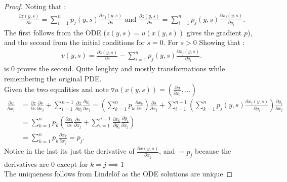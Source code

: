 \begin{proof}
Noting that : 
\begin{align*}
  \frac{\partial z(y,s)}{\partial s} =  \sum_{i=1}^n p_j(y,s)\frac{\partial x_j(y,s)}{\partial s}  \text{  and  } \frac{\partial z(y,s)}{\partial s} =  \sum_{i=1}^n p_j(y,s)\frac{\partial x_j(y,s)}{\partial y_i}
.\end{align*}
The first follows from the ODE ($z(y,s)=u(x(y,s)) $  gives the gradient $p$),
and the second from the initial conditions for $s=0$. For $s>0$
Showing that : 
\begin{align*}
  v(y,s) = \frac{\partial z(y,s)}{\partial s} -  \sum_{i=1}^n p_j(y,s)\frac{\partial x_j(y,s)}{\partial y_i}
.\end{align*}
is 0 proves the second. Quite lenghty and mostly transformations while remembering the original PDE.\\[1ex]
Given the two equalities and note $\triangledown u(x(y,s))  = (\frac{\partial u}{\partial x_1},\ldots  )$
\begin{align*}
  \frac{\partial u}{\partial x_j} &= \frac{\partial z}{\partial s}\frac{\partial s}{\partial x_j} + \sum_{i=1}^{n-1}  \frac{\partial z}{\partial y_{i}}\frac{\partial y_{i}}{\partial x_{j}} =  (\sum_{k=1}^n p_k \frac{\partial x_k}{\partial s} )\frac{\partial s}{\partial x_j} +     \sum_{i=1}^{n-1}  (\sum_{k=1}^n p_j(y,s)\frac{\partial x_j(y,s)}{\partial y_i})\frac{\partial y_{i}}{\partial x_{j}}\\
                                  &= \sum_{k=1}^n p_k (\frac{\partial x_k}{\partial s}\frac{\partial s}{\partial x_j} + \sum_{i=1}^{n-1} \frac{\partial x_k}{\partial y_{i}}\frac{\partial y_{i}}{\partial x_{j}}    ) \\
                                  &= \sum_{k=1}^{n} p_k \frac{\partial x_k}{\partial x_j}  = p_j
.\end{align*}
Notice in the last its just the derivative of $\frac{\partial x(y,s)}{\partial x_j} $, and $=p_j$ because the derivatives are 0 except for $k=j \implies 1$ \\[1ex]
The uniqueness follows from Lindelöf as the ODE solutions are unique
\end{proof}
